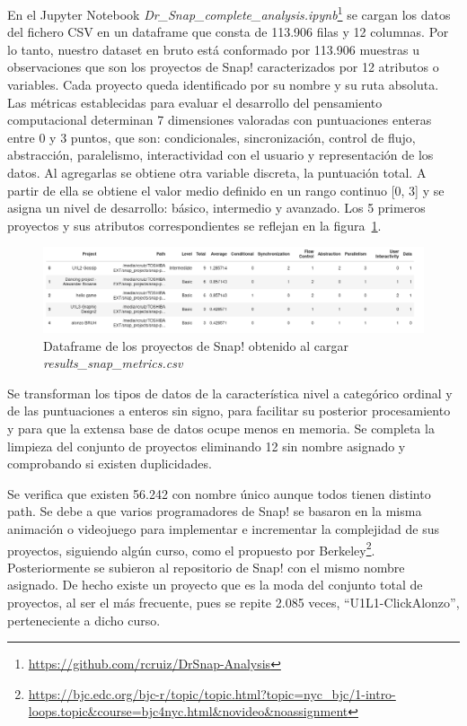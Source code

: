 \documentclass[a4paper, 12pt]{book}
\begin{document}
En el Jupyter Notebook \emph{ Dr\_Snap\_complete\_analysis.ipynb}\footnote{\url{https://github.com/rcruiz/DrSnap-Analysis}} se cargan los datos del fichero CSV en un dataframe que consta de 113.906 filas y 12 columnas. Por lo tanto, nuestro dataset en bruto está conformado por 113.906 muestras u observaciones que son los proyectos de Snap! caracterizados por 12 atributos o variables. Cada proyecto queda identificado por su nombre y su ruta absoluta. 
Las métricas establecidas para evaluar el desarrollo del pensamiento computacional determinan 7 dimensiones valoradas con puntuaciones enteras entre 0 y 3 puntos, que son: condicionales, sincronización, control de flujo, abstracción, paralelismo, interactividad con el usuario y representación de los datos. Al agregarlas se obtiene otra variable discreta, la puntuación total. A partir de ella se obtiene el valor medio definido en un rango continuo [0, 3] y se asigna un nivel de desarrollo: básico, intermedio y avanzado. Los 5 primeros proyectos y sus atributos correspondientes se reflejan en la figura~\ref{fig:df_Snap}.

\begin{figure}[H]
    \centering
    \includegraphics[width=1.0\textwidth]{img/df_origen_Snap.png}
    \caption{Dataframe de los proyectos de Snap! obtenido al cargar \emph{results\_snap\_metrics.csv}}
    \label{fig:df_Snap}
\end{figure}

Se transforman los tipos de datos de la característica nivel a categórico ordinal y de las puntuaciones a enteros sin signo, para facilitar su posterior procesamiento y para que la extensa base de datos ocupe menos en memoria. Se completa la limpieza del conjunto de proyectos eliminando 12 sin nombre asignado y comprobando si existen duplicidades.

Se verifica que existen 56.242 con nombre único aunque todos tienen distinto path. Se debe a que varios programadores de Snap! se basaron en la misma animación o videojuego para implementar e incrementar la complejidad de sus proyectos, siguiendo algún curso, como el propuesto por Berkeley\footnote{\url{https://bjc.edc.org/bjc-r/topic/topic.html?topic=nyc_bjc/1-intro-loops.topic&course=bjc4nyc.html&novideo&noassignment}}. Posteriormente se subieron al repositorio de Snap! con el mismo nombre asignado. De hecho existe un proyecto que es la moda del conjunto total de proyectos, al ser el más frecuente, pues se repite 2.085 veces, ``U1L1-ClickAlonzo'', perteneciente a dicho curso.
\end{document}
